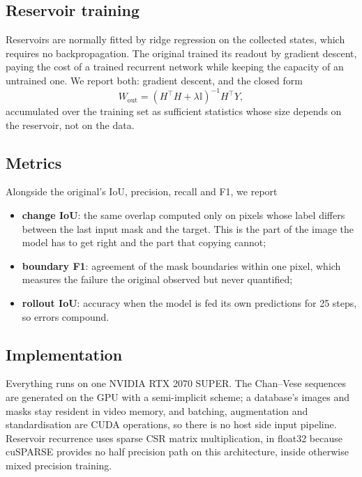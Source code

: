 \documentclass[11pt,a4paper]{article}
\begin{document}
\subsection{Reservoir training}

Reservoirs are normally fitted by ridge regression on the collected states,
which requires no backpropagation. The original trained its readout by gradient
descent, paying the cost of a trained recurrent network while keeping the
capacity of an untrained one. We report both: gradient descent, and the closed
form
\begin{equation}
W_{\text{out}} = (H^\top H + \lambda \mathbb{I})^{-1} H^\top Y ,
\end{equation}
accumulated over the training set as sufficient statistics whose size depends
on the reservoir, not on the data.

\subsection{Metrics}

Alongside the original's IoU, precision, recall and F1, we report

\begin{itemize}
\item \textbf{change IoU}: the same overlap computed only on pixels whose label
differs between the last input mask and the target. This is the part of the
image the model has to get right and the part that copying cannot;
\item \textbf{boundary F1}: agreement of the mask boundaries within one pixel,
which measures the failure the original observed but never quantified;
\item \textbf{rollout IoU}: accuracy when the model is fed its own predictions
for 25 steps, so errors compound.
\end{itemize}

\subsection{Implementation}

Everything runs on one NVIDIA RTX 2070 SUPER. The Chan--Vese sequences are
generated on the GPU with a semi-implicit scheme; a database's images and masks
stay resident in video memory, and batching, augmentation and standardisation
are CUDA operations, so there is no host side input pipeline. Reservoir
recurrence uses sparse CSR matrix multiplication, in float32 because cuSPARSE
provides no half precision path on this architecture, inside otherwise
mixed precision training.
\end{document}
